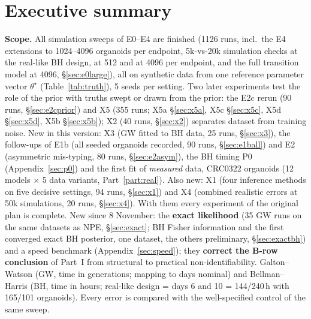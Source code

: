 \documentclass[10pt,a4paper]{article}
\newcommand{\sref}[1]{\S\ref{#1}}
\begin{document}
\section*{Executive summary}\label{sec:summary}

\textbf{Scope.} All simulation sweeps of E0--E4 are finished (1126 runs, incl.\ the E4 extensions to 1024--4096 organoids per endpoint, 5k-vs-20k simulation checks at the real-like BH design, at 512 and at 4096 per endpoint, and the full transition model at 4096, \S\ref{sec:e0large}), all on synthetic data from one reference parameter vector $\theta^\star$ (Table~\ref{tab:truth}), 5 seeds per setting. Two later experiments test the role of the prior with truths swept or drawn from the prior: the E2c rerun (90 runs, \S\ref{sec:e2cprior}) and X5 (355 runs; X5a \S\ref{sec:x5a}, X5c \S\ref{sec:x5c}, X5d \S\ref{sec:x5d}, X5b \S\ref{sec:x5b}); X2 (40 runs, \S\ref{sec:x2}) separates dataset from training noise. New in this version: X3 (GW fitted to BH data, 25 runs, \S\ref{sec:x3}), the follow-ups of E1b (all seeded organoids recorded, 90 runs, \S\ref{sec:e1ball}) and E2 (asymmetric mis-typing, 80 runs, \S\ref{sec:e2asym}), the BH timing P0 (Appendix~\ref{sec:p0}) and the first fit of \emph{measured} data, CRC0322 organoids (12 models $\times$ 5 data variants, Part~\ref{part:real}). Also new: X1 (four inference methods on five decisive settings, 94 runs, \S\ref{sec:x1}) and X4 (combined realistic errors at 50k simulations, 20 runs, \S\ref{sec:x4}). With them every experiment of the original plan is complete. New since 8 November: the \textbf{exact likelihood} (35 GW runs on the same datasets as NPE, \sref{sec:exact}; BH Fisher information and the first converged exact BH posterior, one dataset, the others preliminary, \sref{sec:exactbh}) and a speed benchmark (Appendix~\ref{sec:speed}); they \textbf{correct the B-row conclusion} of Part~I from structural to practical non-identifiability. Galton--Watson (GW, time in generations; mapping to days nominal) and Bellman--Harris (BH, time in hours; real-like design = days 6 and 10 = 144/240\,h with 165/101 organoids). Every error is compared with the well-specified control of the same sweep.
\end{document}
